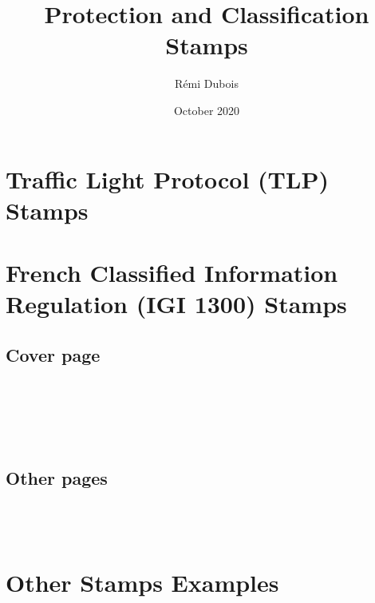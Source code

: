 \documentclass[11pt]{article}
\title{Protection and Classification Stamps}
\author{Rémi Dubois}
\date{October 2020}
\begin{document}
\section{Traffic Light Protocol (TLP) Stamps}

\begin{center}
\end{center}

\section{French Classified Information Regulation (IGI 1300) Stamps}

\subsection{Cover page}
\begin{center}
    \\
    \\
    \\
    \\
\end{center}

\subsection{Other pages}

\begin{center}
    \\
    \\
\end{center}

\section{Other Stamps Examples}

\begin{center}
\end{center}
\end{document}

